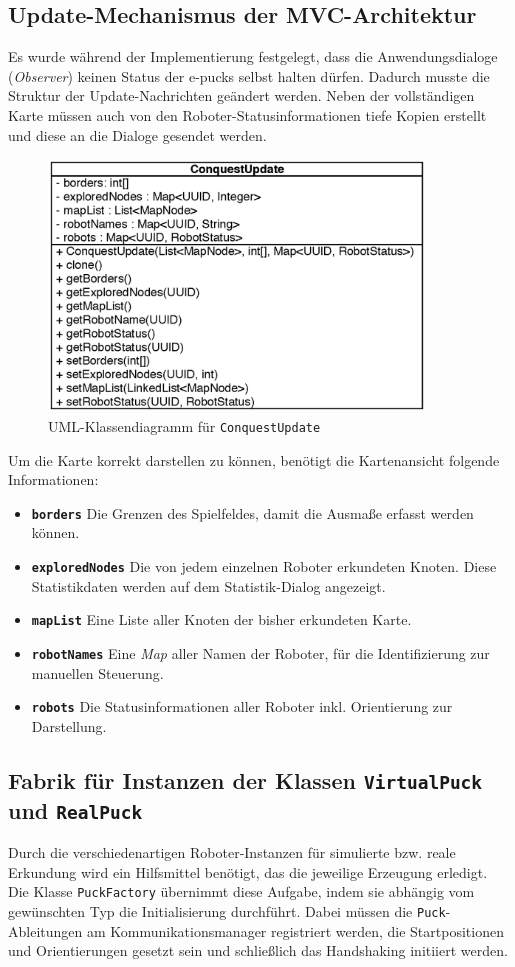 \documentclass[10pt,a4paper]{article}
\begin{document}
		\subsection{Update-Mechanismus der MVC-Architektur}
			Es wurde während der Implementierung festgelegt, dass die Anwendungsdialoge (\textit{Observer}) keinen Status der e-pucks selbst halten dürfen.
			Dadurch musste die Struktur der Update-Nachrichten geändert werden. Neben der vollständigen Karte müssen auch von den Roboter-Statusinformationen
			tiefe Kopien erstellt und diese an die Dialoge gesendet werden.
			\begin{figure}[htbp]
				\centering
				\includegraphics[width=10cm]{images/uml_ConquestUpdate.eps}
  				\caption{UML-Klassendiagramm für \texttt{ConquestUpdate}}
  				\label{fig:uml_ConquestUpdate}
  			\end{figure}				
			Um die Karte korrekt darstellen zu können, benötigt die Kartenansicht folgende Informationen:
			\begin{itemize}
				\item \textbf{\texttt{borders}} Die Grenzen des Spielfeldes, damit die Ausmaße erfasst werden können.
				\item \textbf{\texttt{exploredNodes}} Die von jedem einzelnen Roboter erkundeten Knoten. Diese Statistikdaten werden auf dem Statistik-Dialog
					angezeigt.
				\item \textbf{\texttt{mapList}} Eine Liste aller Knoten der bisher erkundeten Karte.
				\item \textbf{\texttt{robotNames}} Eine \textit{Map} aller Namen der Roboter, für die Identifizierung zur manuellen Steuerung.
				\item \textbf{\texttt{robots}} Die Statusinformationen aller Roboter inkl. Orientierung zur Darstellung.
			\end{itemize}  	
				
  		\subsection{Fabrik für Instanzen der Klassen \texttt{VirtualPuck} und \texttt{RealPuck}}
  			Durch die verschiedenartigen Roboter-Instanzen für simulierte bzw. reale Erkundung wird ein Hilfsmittel benötigt, das die jeweilige Erzeugung
  			erledigt. Die Klasse \texttt{PuckFactory} übernimmt diese Aufgabe, indem sie abhängig vom gewünschten Typ die Initialisierung durchführt.
  			Dabei müssen die \texttt{Puck}-Ableitungen am Kommunikationsmanager registriert werden, die Startpositionen und Orientierungen gesetzt sein und
  			schließlich das Handshaking initiiert werden.
  			
\end{document}
